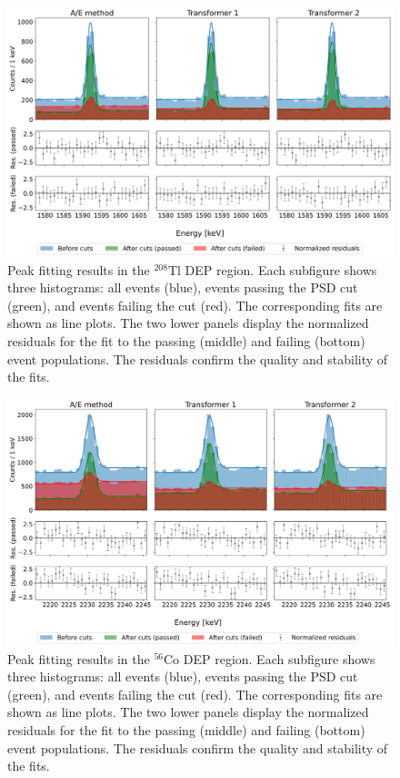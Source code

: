 \begin{figure}[t]
    \centering
    \includegraphics[width=\linewidth]{figures/05_PSD/Peakfit_Tl208_V00048A.png}
    \caption{Peak fitting results in the $^{208}$Tl DEP region. Each subfigure shows three histograms: all events (blue), events passing the PSD cut (green), and events failing the cut (red). The corresponding fits are shown as line plots. The two lower panels display the normalized residuals for the fit to the passing (middle) and failing (bottom) event populations. The residuals confirm the quality and stability of the fits.} 
\label{fig:peakfit_example_Tl}
\end{figure}


\begin{figure}[t]
    \centering
    \includegraphics[width=\linewidth]{figures/05_PSD/Peakfit_Co56_V00048A.png}
    \caption{Peak fitting results in the $^{56}$Co DEP region. Each subfigure shows three histograms: all events (blue), events passing the PSD cut (green), and events failing the cut (red). The corresponding fits are shown as line plots. The two lower panels display the normalized residuals for the fit to the passing (middle) and failing (bottom) event populations. The residuals confirm the quality and stability of the fits. } 
\label{fig:peakfit_example_Co}
\end{figure}


